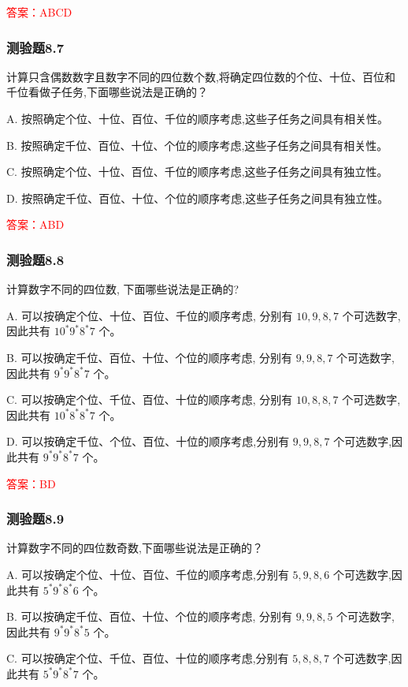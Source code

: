 \documentclass[UTF8, heading=true]{ctexart}
\begin{document}
\textcolor{red}{答案：ABCD}

\subsubsection{测验题8.7}
计算只含偶数数字且数字不同的四位数个数,将确定四位数的个位、十位、百位和千位看做子任务,下面哪些说法是正确的？

A. 按照确定个位、十位、百位、千位的顺序考虑,这些子任务之间具有相关性。

B. 按照确定千位、百位、十位、个位的顺序考虑,这些子任务之间具有相关性。

C. 按照确定个位、十位、百位、千位的顺序考虑,这些子任务之间具有独立性。

D. 按照确定千位、百位、十位、个位的顺序考虑,这些子任务之间具有独立性。

\textcolor{red}{答案：ABD}

\subsubsection{测验题8.8}
计算数字不同的四位数, 下面哪些说法是正确的?

A. 可以按确定个位、十位、百位、千位的顺序考虑, 分别有 $10,9,8,7$ 个可选数字, 因此共有 $10^* 9 ^* 8^* 7$ 个。

B. 可以按确定千位、百位、十位、个位的顺序考虑, 分别有 $9,9,8,7$ 个可选数字,因此共有 $9^* 9^* 8^* 7$ 个。

C. 可以按确定个位、千位、百位、十位的顺序考虑, 分别有 $10,8,8,7$ 个可选数字, 因此共有 $10^* 8^* 8^* 7$ 个。

D. 可以按确定千位、个位、百位、十位的顺序考虑,分别有 $9,9,8,7$ 个可选数字,因此共有 $9^* 9^* 8^* 7$ 个。

\textcolor{red}{答案：BD}

\subsubsection{测验题8.9}

计算数字不同的四位数奇数,下面哪些说法是正确的？

A. 可以按确定个位、十位、百位、千位的顺序考虑,分别有 $5,9,8,6$ 个可选数字,因此共有 $5^* 9^* 8^* 6$ 个。

B. 可以按确定千位、百位、十位、个位的顺序考虑, 分别有 $9,9,8,5$ 个可选数字, 因此共有 $9 ^* 9 ^* 8 ^* 5$ 个。

C. 可以按确定个位、千位、百位、十位的顺序考虑,分别有 $5,8,8,7$ 个可选数字,因此共有 $5 ^* 9 ^* 8 ^* 7$ 个。
\end{document}
